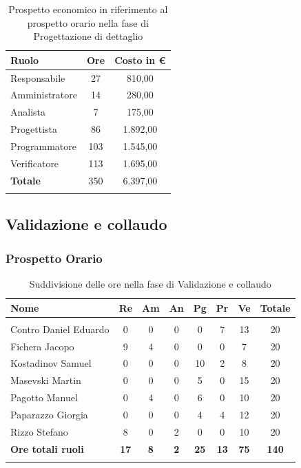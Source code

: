 \documentclass[../piano_di_progetto.tex]{subfiles}
\begin{document}
\begin{center}
	\begin{longtable}{|l|c|c|}
		\hline
		\rowcolor{lightgray}
		\textbf{Ruolo} & \textbf{Ore} & \textbf{Costo in €}\\
		\hline
		Responsabile & 27 & 810,00\\
		Amministratore & 14 & 280,00\\
		Analista & 7 & 175,00\\
		Progettista & 86 & 1.892,00\\
		Programmatore & 103 & 1.545,00\\
		Verificatore & 113 & 1.695,00\\
		\hline
		\textbf{Totale} & 350 & 6.397,00\\
		\hline
		\rowcolor{white}
		\caption{Prospetto economico in riferimento al prospetto orario nella fase di Progettazione di dettaglio}
	\end{longtable}
\end{center}

\subsection{Validazione e collaudo}%
\label{sub:fase_valid_collaudo}
\subsubsection{Prospetto Orario}

\begin{center}
	\begin{longtable}{|l|c|c|c|c|c|c|c|}
		\hline
		\rowcolor{lightgray}
		\textbf{Nome} & \textbf{Re} & \textbf{Am} & \textbf{An} & \textbf{Pg}  & \textbf{Pr}   & \textbf{Ve} & \textbf{Totale} \\
		\hline
		\endhead
		
		\hline
		\rowcolor{white}
		\multicolumn{8}{|c|}{\emph{Continua alla pagina successiva...}}\\
		\hline
		\endfoot

		\endlastfoot
			Contro Daniel Eduardo & 0 & 0 & 0 & 0 & 7 & 13 & 20\\
			Fichera Jacopo & 9 & 4 & 0 & 0 & 0 & 7 & 20 \\ 
			Kostadinov Samuel & 0 & 0 & 0 & 10 & 2 & 8 & 20 \\ 		
			Masevski Martin & 0 & 0 & 0 & 5 & 0 & 15 & 20 \\
			Pagotto Manuel & 0 & 4 & 0 & 6 & 0 & 10 & 20 \\			
			Paparazzo Giorgia & 0 & 0 & 0 & 4 & 4 & 12 & 20 \\
			Rizzo Stefano & 8 & 0 & 2 & 0 & 0 & 10 & 20 \\
			\hline
			\textbf{Ore totali ruoli} & \textbf{17} & \textbf{8} & \textbf{2} & \textbf{25} & \textbf{13} & \textbf{75} & \textbf{140} \\
			\hline
		\rowcolor{white}
		\caption{Suddivisione delle ore nella fase di Validazione e collaudo}
	\end{longtable}
\end{center}
\end{document}
